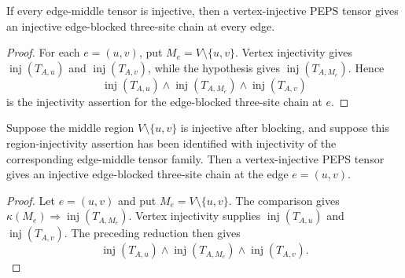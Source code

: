 \begin{theorem}%
    \label{thm:peps_edgeBlockedThreeSiteInjective_all_of_middle}
    \leanok
    If every edge-middle tensor is injective, then a vertex-injective PEPS
    tensor gives an injective edge-blocked three-site chain at every edge.
\end{theorem}
\begin{proof}\leanok
    For each $e=(u,v)$, put $M_e=V\setminus\{u,v\}$. Vertex injectivity gives
    $\operatorname{inj}(T_{A,u})$ and $\operatorname{inj}(T_{A,v})$, while the
    hypothesis gives $\operatorname{inj}(T_{A,M_e})$. Hence
    \[
        \operatorname{inj}(T_{A,u})\wedge
        \operatorname{inj}(T_{A,M_e})\wedge
        \operatorname{inj}(T_{A,v})
    \]
    is the injectivity assertion for the edge-blocked three-site chain at $e$.
\end{proof}

\begin{theorem}%
    \label{thm:peps_edgeBlockedThreeSiteInjective_of_region}
    \leanok
    Suppose the middle region $V\setminus\{u,v\}$ is injective after
    blocking, and suppose this region-injectivity assertion has been identified
    with injectivity of the corresponding edge-middle tensor family. Then a
    vertex-injective PEPS tensor gives an injective edge-blocked three-site
    chain at the edge $e=(u,v)$.
\end{theorem}
\begin{proof}\leanok
    Let $e=(u,v)$ and put $M_e=V\setminus\{u,v\}$. The comparison gives
    $\kappa(M_e)\Longrightarrow\operatorname{inj}(T_{A,M_e})$. Vertex injectivity
    supplies $\operatorname{inj}(T_{A,u})$ and $\operatorname{inj}(T_{A,v})$.
    The preceding reduction then gives
    \[
        \operatorname{inj}(T_{A,u})\wedge
        \operatorname{inj}(T_{A,M_e})\wedge
        \operatorname{inj}(T_{A,v}).
    \]
\end{proof}

